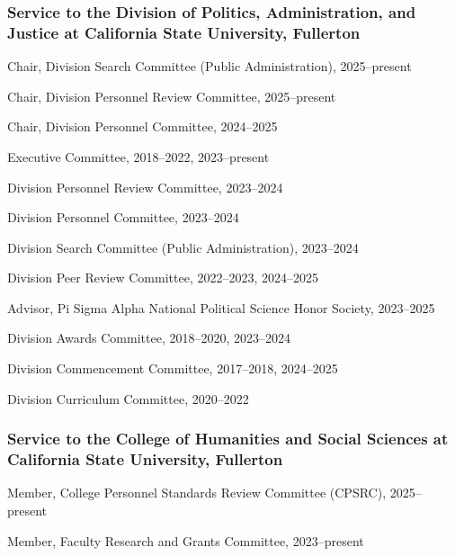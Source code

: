 \documentclass[12pt,letterpaper]{article}
\renewenvironment{itemize}{
  \begin{list}{}{
    \setlength{\leftmargin}{1.5em}
    \setlength{\itemsep}{0.25em}
    \setlength{\parskip}{0pt}
    \setlength{\parsep}{0.25em}
  }
}{
  \end{list}
}
\begin{document}
\subsubsection*{Service to the Division of Politics, Administration, and Justice at California State University, Fullerton}
\begin{itemize}\leftmargin=2pt\itemindent=-15pt
    \item Chair, Division Search Committee (Public Administration), 2025--present
    \item Chair, Division Personnel Review Committee, 2025--present
    \item Chair, Division Personnel Committee, 2024--2025
    \item Executive Committee, 2018--2022, 2023--present
    \item Division Personnel Review Committee, 2023--2024
    \item Division Personnel Committee, 2023--2024
    \item Division Search Committee (Public Administration), 2023--2024
    \item Division Peer Review Committee, 2022--2023, 2024--2025
    \item Advisor, Pi Sigma Alpha National Political Science Honor Society, 2023--2025
    \item Division Awards Committee, 2018--2020, 2023--2024
    \item Division Commencement Committee, 2017--2018, 2024--2025
    \item Division Curriculum Committee, 2020--2022
\end{itemize}

\subsubsection*{Service to the College of Humanities and Social Sciences at California State University, Fullerton}
\begin{itemize}\leftmargin=2pt\itemindent=-15pt
    \item Member, College Personnel Standards Review Committee (CPSRC), 2025--present
    \item Member, Faculty Research and Grants Committee, 2023--present
\end{itemize}
\end{document}
